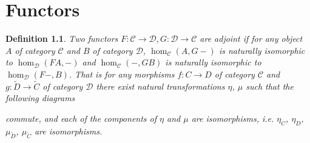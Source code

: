 \documentclass[12pt]{report}
\newcommand{\mcC}{\mathcal{C}}
\newcommand{\mcD}{\mathcal{D}}
\newtheorem{defn}[thm]{Definition} %
\begin{document}
\chapter{Functors}
\begin{defn}
  Two functors $F: \mcC \to \mcD, G: \mcD \to \mcC$ are adjoint if for any object $A$ of category $\mcC$ and $B$ of category $\mcD$,
  $\hom_{\mcC}(A,G-)$ is naturally isomorphic to $\hom_{\mcD}(FA,-)$ and $\hom_{\mcC}(-,GB)$ is naturally isomorphic to  $\hom_{\mcD}(F-,B)$.
  That is for any morphisms $f:C \to D$ of category $\mcC$ and $g: \widetilde{D} \to \widetilde{C}$ of category $\mcD$ there exist natural transformations $\eta$, $\mu$ such that the following diagrams
  \begin{center}
  \end{center}
  \begin{center}
\end{center}
  commute, and each of the components of $\eta$ and $\mu$ are isomorphisms, i.e. $\eta_C$, $\eta_D$, $\mu_{\widetilde{D}}$, $\mu_{\widetilde{C}}$ are isomorphisms.

\end{defn}
\end{document}
